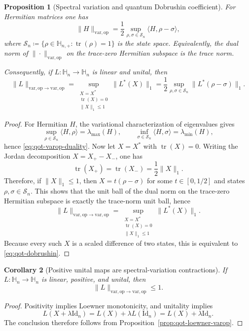 \documentclass[11pt]{article}
\newcommand{\Id}{\mathrm{Id}}
\newcommand{\tr}{\operatorname{tr}}
\newcommand{\eqdef}{\coloneqq}
\newcommand{\dotp}[2]{\langle #1,#2\rangle}
\newcommand{\Hh}{\mathbb{H}}
\newcommand{\Ss}{\mathcal{S}}
\newcommand{\op}{\mathrm{op}}
\newcommand{\varop}{\mathrm{var},\op}
\theoremstyle{plain}
\newtheorem{proposition}{Proposition}[section]
\newtheorem{corollary}[proposition]{Corollary}
\begin{document}
\begin{proposition}[Spectral variation and quantum Dobrushin coefficient]
\label{prop:qot-dobrushin-duality}
For Hermitian matrices one has
\begin{equation}
\label{eq:qot-varop-duality}
\|H\|_{\varop}
=
\frac12 \sup_{\rho,\sigma \in \Ss_n} \dotp{H}{\rho-\sigma},
\end{equation}
where $\Ss_n \eqdef \{\rho \in \Hh_{n,+} : \tr(\rho)=1\}$ is the state space.
Equivalently, the dual norm of $\|\cdot\|_{\varop}$ on the trace-zero Hermitian subspace is the trace norm.

Consequently, if $L:\Hh_n\to\Hh_n$ is linear and unital, then
\begin{equation}
\label{eq:qot-dobrushin}
\|L\|_{\varop\to\varop}
=
\sup_{\substack{X=X^\ast\\ \tr(X)=0\\ \|X\|_1\le 1}}
\|L^\ast(X)\|_1
=
\frac12 \sup_{\rho,\sigma\in \Ss_n}\|L^\ast(\rho-\sigma)\|_1.
\end{equation}
\end{proposition}

\begin{proof}
For Hermitian $H$, the variational characterization of eigenvalues gives
\[
\sup_{\rho\in \Ss_n}\dotp{H}{\rho}=\lambda_{\max}(H),
\qquad
\inf_{\sigma\in \Ss_n}\dotp{H}{\sigma}=\lambda_{\min}(H),
\]
hence \eqref{eq:qot-varop-duality}.
Now let $X=X^\ast$ with $\tr(X)=0$.
Writing the Jordan decomposition $X=X_+-X_-$, one has
\[
\tr(X_+)=\tr(X_-)=\frac12\|X\|_1.
\]
Therefore, if $\|X\|_1\le 1$, then $X=t(\rho-\sigma)$ for some $t\in[0,1/2]$ and states $\rho,\sigma\in \Ss_n$.
This shows that the unit ball of the dual norm on the trace-zero Hermitian subspace is exactly the trace-norm unit ball, hence
\[
\|L\|_{\varop\to\varop}
=
\sup_{\substack{X=X^\ast\\ \tr(X)=0\\ \|X\|_1\le 1}}
\|L^\ast(X)\|_1.
\]
Because every such $X$ is a scaled difference of two states, this is equivalent to \eqref{eq:qot-dobrushin}.
\end{proof}

\begin{corollary}[Positive unital maps are spectral-variation contractions]
\label{cor:qot-positive-unital-varop}
If $L:\Hh_n\to\Hh_n$ is linear, positive, and unital, then
\[
\|L\|_{\varop\to\varop}\le 1.
\]
\end{corollary}

\begin{proof}
Positivity implies Loewner monotonicity, and unitality implies
\[
L(X+\lambda \Id_n)=L(X)+\lambda L(\Id_n)=L(X)+\lambda \Id_n.
\]
The conclusion therefore follows from Proposition~\ref{prop:qot-loewner-varop}.
\end{proof}
\end{document}
